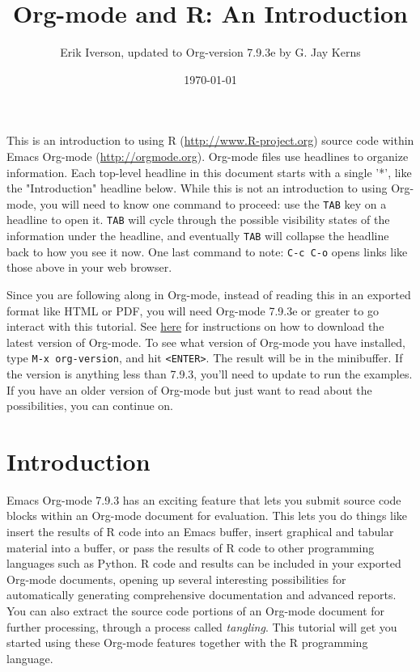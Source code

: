 \documentclass[11pt]{article}
\author{Erik Iverson, updated to Org-version 7.9.3e by G. Jay Kerns}
\date{\today}
\title{Org-mode and R: An Introduction}
\begin{document}
\maketitle
\setcounter{tocdepth}{2}
\tableofcontents
\vspace*{1cm}

This is an introduction to using R (\url{http://www.R-project.org}) source code within Emacs Org-mode (\url{http://orgmode.org}). Org-mode files use headlines to organize information. Each top-level headline in this document starts with a single '*', like the "Introduction" headline below. While this is not an introduction to using Org-mode, you will need to know one command to proceed: use the \texttt{TAB} key on a headline to open it. \texttt{TAB} will cycle through the possible visibility states of the information under the headline, and eventually \texttt{TAB} will collapse the headline back to how you see it now. One last command to note: \texttt{C-c C-o} opens links like those above in your web browser.

Since you are following along in Org-mode, instead of reading this in an exported format like HTML or PDF, you will need Org-mode 7.9.3e or greater to go interact with this tutorial. See \href{http://orgmode.org/index.html#sec-3}{here} for instructions on how to download the latest version of Org-mode. To see what version of Org-mode you have installed, type \texttt{M-x org-version}, and hit \texttt{<ENTER>}. The result will be in the minibuffer. If the version is anything less than 7.9.3, you'll need to update to run the examples. If you have an older version of Org-mode but just want to read about the possibilities, you can continue on.

\section*{Introduction}
\label{sec-1}

Emacs Org-mode 7.9.3 has an exciting feature that lets you submit source code blocks within an Org-mode document for evaluation. This lets you do things like insert the results of R code into an Emacs buffer, insert graphical and tabular material into a buffer, or pass the results of R code to other programming languages such as Python. R code and results can be included in your exported Org-mode documents, opening up several interesting possibilities for automatically generating comprehensive documentation and advanced reports. You can also extract the source code portions of an Org-mode document for further processing, through a process called \emph{tangling}. This tutorial will get you started using these Org-mode features together with the R programming language.
\end{document}
